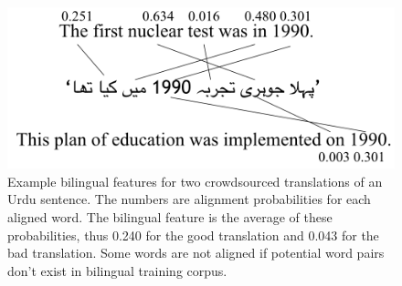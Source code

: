 \documentclass[11pt,letterpaper]{article}
\begin{document}
\begin{figure}
  \centering
  \includegraphics[width=\linewidth]{bilingualexample/example.png}
  \caption{Example bilingual features for two crowdsourced translations of an Urdu sentence. The numbers are alignment probabilities for each aligned word. The bilingual feature is the average of these probabilities, thus 0.240 for the good translation and 0.043 for the bad translation. Some words are not aligned if potential word pairs don't exist in bilingual training corpus.
}
    \label{biexample1}
\end{figure}

\end{document}
